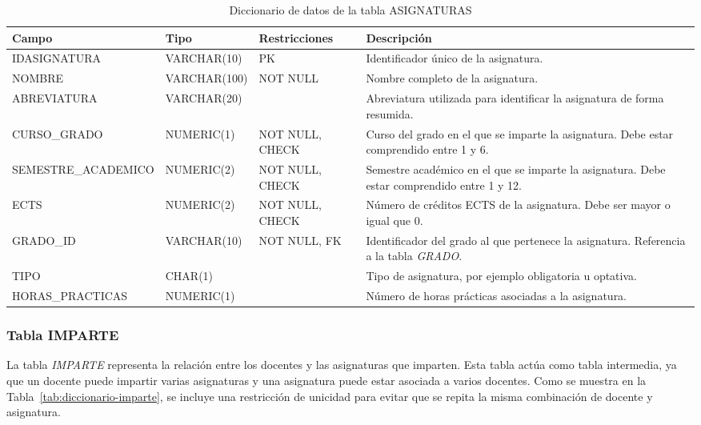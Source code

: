 \begin{table}[H]
	\centering
	\scriptsize
	\setlength{\tabcolsep}{3pt}
	\renewcommand{\arraystretch}{1.15}
	\begin{tabularx}{\textwidth}{@{}
			>{\raggedright\arraybackslash}p{2.6cm}
			>{\raggedright\arraybackslash}p{2.2cm}
			>{\raggedright\arraybackslash}p{2.2cm}
			X@{}}
		\toprule
		\textbf{Campo} & \textbf{Tipo} & \textbf{Restricciones} & \textbf{Descripción} \\
		\midrule
		IDASIGNATURA & VARCHAR(10) & PK & Identificador único de la asignatura. \\
		NOMBRE & VARCHAR(100) & NOT NULL & Nombre completo de la asignatura. \\
		ABREVIATURA & VARCHAR(20) &  & Abreviatura utilizada para identificar la asignatura de forma resumida. \\
		CURSO\_GRADO & NUMERIC(1) & NOT NULL, CHECK & Curso del grado en el que se imparte la asignatura. Debe estar comprendido entre 1 y 6. \\
		SEMESTRE\_\newline ACADEMICO & NUMERIC(2) & NOT NULL, CHECK & Semestre académico en el que se imparte la asignatura. Debe estar comprendido entre 1 y 12. \\
		ECTS & NUMERIC(2) & NOT NULL, CHECK & Número de créditos ECTS de la asignatura. Debe ser mayor o igual que 0. \\
		GRADO\_ID & VARCHAR(10) & NOT NULL, FK & Identificador del grado al que pertenece la asignatura. Referencia a la tabla \textit{GRADO}. \\
		TIPO & CHAR(1) &  & Tipo de asignatura, por ejemplo obligatoria u optativa. \\
		HORAS\_\newline PRACTICAS & NUMERIC(1) &  & Número de horas prácticas asociadas a la asignatura. \\
		\bottomrule
	\end{tabularx}
	\caption{Diccionario de datos de la tabla ASIGNATURAS}
	\label{tab:diccionario-asignaturas}
\end{table}

\subsubsection{Tabla IMPARTE}

 La tabla \textit{IMPARTE} representa la relación entre los docentes y las asignaturas que imparten. Esta tabla actúa como tabla intermedia, ya que un docente puede impartir varias asignaturas y una asignatura puede estar asociada a varios docentes. Como se muestra en la Tabla~\ref{tab:diccionario-imparte}, se incluye una restricción de unicidad para evitar que se repita la misma combinación de docente y asignatura.\\

